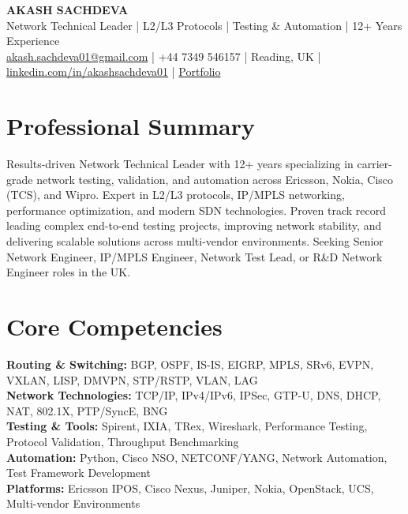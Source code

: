 \documentclass[10pt,a4paper]{article}
\begin{document}
\begin{center}
    {\LARGE \textbf{AKASH SACHDEVA}}\\[4pt]
    Network Technical Leader | L2/L3 Protocols | Testing \& Automation | 12+ Years Experience\\[2pt]
    \href{mailto:akash.sachdeva01@gmail.com}{akash.sachdeva01@gmail.com} | 
    +44 7349 546157 | 
    Reading, UK | 
    \href{https://linkedin.com/in/akashsachdeva01}{linkedin.com/in/akashsachdeva01} | 
    \href{https://akashsachdeva01.github.io/portfolio/}{Portfolio}
\end{center}

\vspace{-8pt}

\section*{Professional Summary}
Results-driven Network Technical Leader with 12+ years specializing in carrier-grade network testing, validation, and automation across Ericsson, Nokia, Cisco (TCS), and Wipro. Expert in L2/L3 protocols, IP/MPLS networking, performance optimization, and modern SDN technologies. Proven track record leading complex end-to-end testing projects, improving network stability, and delivering scalable solutions across multi-vendor environments. Seeking Senior Network Engineer, IP/MPLS Engineer, Network Test Lead, or R\&D Network Engineer roles in the UK.

\vspace{-4pt}

\section*{Core Competencies}
\textbf{Routing \& Switching:} BGP, OSPF, IS-IS, EIGRP, MPLS, SRv6, EVPN, VXLAN, LISP, DMVPN, STP/RSTP, VLAN, LAG\\
\textbf{Network Technologies:} TCP/IP, IPv4/IPv6, IPSec, GTP-U, DNS, DHCP, NAT, 802.1X, PTP/SyncE, BNG\\
\textbf{Testing \& Tools:} Spirent, IXIA, TRex, Wireshark, Performance Testing, Protocol Validation, Throughput Benchmarking\\
\textbf{Automation:} Python, Cisco NSO, NETCONF/YANG, Network Automation, Test Framework Development\\
\textbf{Platforms:} Ericsson IPOS, Cisco Nexus, Juniper, Nokia, OpenStack, UCS, Multi-vendor Environments
\end{document}
